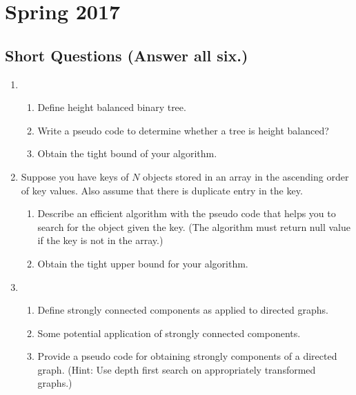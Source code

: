 
\section{Spring 2017}

\subsection{Short Questions (Answer all six.)}

\begin{enumerate}
	\item \begin{enumerate}[label=\alph*.]
		\item Define height balanced binary tree.
		\item Write a pseudo code to determine whether a tree is height balanced?
		\item Obtain the tight bound of your algorithm.
	\end{enumerate}
	
	
	\item Suppose you have keys of $N$ objects stored in an array in the ascending order of key values.  Also assume that there is duplicate entry in the key.  
	\begin{enumerate}[label=\alph*.]
		\item Describe an efficient algorithm with the pseudo code that helps you to search for the object given the key. (The algorithm must return null value if the key is not in the array.) 
		\item Obtain the tight upper bound for your algorithm.
	\end{enumerate}
	

	\item	\begin{enumerate}[label=\alph*.]
		\item Define strongly connected components as applied to directed graphs.
		\item Some potential application of strongly connected components.
		\item Provide a pseudo code for obtaining strongly components of a directed graph.  (Hint:  Use depth first search on appropriately transformed graphs.)
	\end{enumerate}
	

\end{enumerate}
